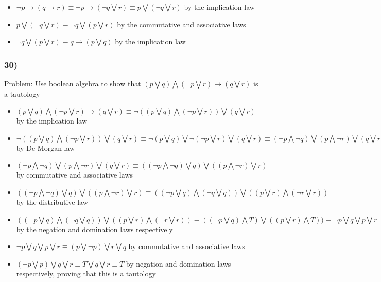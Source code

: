 \documentclass{article}
\begin{document}
\begin{itemize}
	\item $\neg p \rightarrow (q \rightarrow r) \equiv \neg p \rightarrow (\neg q \bigvee r)\equiv p \bigvee (\neg q \bigvee r)$ by the implication law
	\item $p \bigvee (\neg q \bigvee r) \equiv \neg q \bigvee (p \bigvee r)$ by the commutative and associative laws
	\item $\neg q \bigvee (p \bigvee r) \equiv q \rightarrow (p \bigvee q)$ by the implication law 
\end{itemize}
\subsubsection*{30)}
Problem: Use boolean algebra to show that $(p \bigvee q) \bigwedge (\neg p \bigvee r) \rightarrow (q \bigvee r)$ is a tautology

\begin{itemize}
	\item $(p \bigvee q) \bigwedge (\neg p \bigvee r) \rightarrow (q \bigvee r) \equiv \neg ((p \bigvee q) \bigwedge (\neg p \bigvee r)) \bigvee (q \bigvee r)$ by the implication law
	\item $\neg ((p \bigvee q) \bigwedge (\neg p \bigvee r)) \bigvee (q \bigvee r) \equiv \neg (p \bigvee q) \bigvee \neg (\neg p \bigvee r) \bigvee (q \bigvee r) \equiv (\neg p \bigwedge \neg  q) \bigvee (p \bigwedge \neg r) \bigvee (q \bigvee r)$ by De Morgan law
	\item $(\neg p \bigwedge \neg  q) \bigvee (p \bigwedge \neg r) \bigvee (q \bigvee r) \equiv ((\neg p \bigwedge \neg q) \bigvee q) \bigvee ((p \bigwedge \neg r) \bigvee r)$ by commutative and associative laws

	\item $((\neg p \bigwedge \neg q) \bigvee q) \bigvee ((p \bigwedge \neg r) \bigvee r) \equiv ((\neg p \bigvee q) \bigwedge (\neg q
\bigvee q)) \bigvee ((p \bigvee r) \bigwedge (\neg r \bigvee r))$ by the distributive law
	\item $((\neg p \bigvee q) \bigwedge (\neg q \bigvee q)) \bigvee ((p \bigvee r) \bigwedge (\neg r \bigvee r)) \equiv ((\neg p \bigvee q) \bigwedge T) \bigvee ((p \bigvee r) \bigwedge T)) \equiv \neg p \bigvee q \bigvee p \bigvee r$ by the negation and domination laws respectively
	\item $\neg p \bigvee q \bigvee p \bigvee r \equiv (p \bigvee \neg p) \bigvee r \bigvee q$ by commutative and associative laws
	\item $(\neg p \bigvee p) \bigvee q \bigvee r \equiv T \bigvee q \bigvee r \equiv T$ by negation and domination laws respectively, proving that this is a tautology
\end{itemize}
\end{document}
